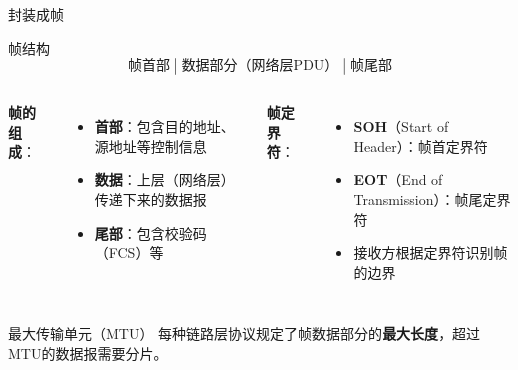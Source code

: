 \documentclass[10pt, aspectratio=169]{beamer}
\begin{document}
\begin{frame}{封装成帧}
    \begin{block}{帧结构}
        $$\boxed{\text{帧首部} \;|\; \text{数据部分（网络层PDU）} \;|\; \text{帧尾部}}$$
    \end{block}
    \vspace{0.3em}
    \begin{columns}[T]
        \textbf{帧的组成}：
        \begin{itemize}
            \item \textbf{首部}：包含目的地址、源地址等控制信息
            \item \textbf{数据}：上层（网络层）传递下来的数据报
            \item \textbf{尾部}：包含校验码（FCS）等
        \end{itemize}
        \textbf{帧定界符}：
        \begin{itemize}
            \item \textbf{SOH}（Start of Header）：帧首定界符
            \item \textbf{EOT}（End of Transmission）：帧尾定界符
            \item 接收方根据定界符识别帧的边界
        \end{itemize}
    \end{columns}
    \vspace{0.3em}
    \begin{block}{最大传输单元（MTU）}
        每种链路层协议规定了帧数据部分的\textbf{最大长度}，超过MTU的数据报需要分片。
    \end{block}
\end{frame}
\end{document}
